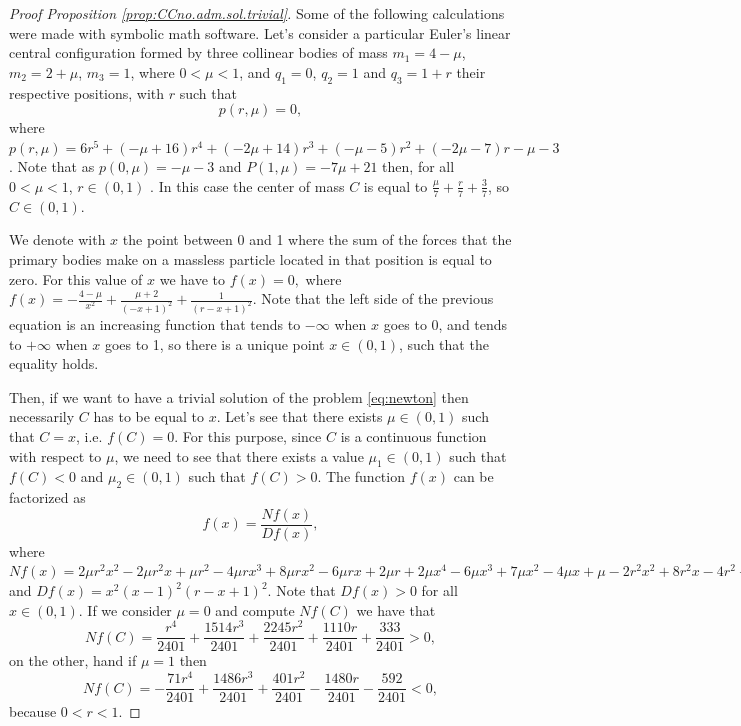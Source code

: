 \documentclass[twoside]{article}
\theoremstyle{remark}
\begin{document}
\begin{proof}[Proof Proposition \ref{prop:CCno.adm.sol.trivial}]
Some of the following calculations were made with symbolic math software. Let's  consider a particular Euler's linear central configuration formed by three collinear bodies of mass $m_1 = 4-\mu$, $m_2 = 2 + \mu$, $m_3 = 1$, where $0<\mu<1$, and $q_1 = 0$, $q_2 = 1$ and $q_3 = 1 + r$ their respective positions, with $r$ such that
\[ p(r,\mu)=0,\]
where $p(r,\mu)=6 r^{5} +\left(- \mu + 16\right) r^{4}  +  \left(- 2 \mu + 14\right) r^{3}+ \left(- \mu - 5\right)  r^{2}+\left(- 2 \mu - 7\right) r - \mu - 3$. Note that as $p(0,\mu)=-\mu-3$ and $P(1,\mu)=-7\mu+21$ then, for all $0<\mu<1$, $r\in (0,1)$ .
In this case the center of mass $C$ is equal to $\frac{\mu}{7} + \frac{r}{7} + \frac{3}{7}$, so $C\in (0,1)$. 

We denote with $x$ the point between 0 and 1 where the sum of the forces that the primary bodies make on a massless particle located in that position is equal to zero. For this value of $x$ we have to
$f(x)=0,$ where $f(x)= - \frac{4-\mu }{x^{2}}+\frac{\mu + 2}{\left(- x + 1\right)^{2}} + \frac{1}{\left(r - x + 1\right)^{2}}$.
Note that the left side of the previous equation is an increasing function that tends to $-\infty$ when $x$ goes to 0, and tends to $+\infty$ when $x$ goes to 1, so there is a unique point $x\in (0,1)$, such that the equality holds.

Then, if we want to have a trivial solution of the problem \eqref{eq:newton} then necessarily $C$ has to be equal to $x$. Let's see that there exists $ \mu \in (0,1) $ such that $ C = x $, i.e. $f(C)=0$. For this purpose, since $C$ is a continuous function with respect to $\mu$,  we need to see that there exists a value $\mu_1\in (0,1)$ such that $f (C) <0$  and   $ \mu_2\in (0,1) $ such that $ f (C)> 0 $.  The function $f(x)$ can be factorized as $$f(x)=\frac{Nf(x)}{Df(x)},$$ where $Nf(x)=2 \mu r^{2} x^{2} - 2 \mu r^{2} x + \mu r^{2} - 4 \mu r x^{3} + 8 \mu r x^{2} - 6 \mu r x + 2 \mu r + 2 \mu x^{4} - 6 \mu x^{3} + 7 \mu x^{2} - 4 \mu x + \mu - 2 r^{2} x^{2} + 8 r^{2} x - 4 r^{2} + 4 r x^{3} - 20 r x^{2} + 24 r x - 8 r - x^{4} + 10 x^{3} - 21 x^{2} + 16 x - 4$ and $Df(x)=x^{2} \left(x - 1\right)^{2} \left(r - x + 1\right)^{2}$. Note that  $Df(x)>0$ for all $x\in (0,1)$. If we consider $\mu=0$ and compute $Nf(C)$ we have that
\[Nf(C)=\frac{r^{4}}{2401} + \frac{1514 r^{3}}{2401} + \frac{2245 r^{2}}{2401} + \frac{1110 r}{2401} + \frac{333}{2401}>0,\]
on the other, hand if  $\mu=1$ then
\[Nf(C)=- \frac{71 r^{4}}{2401} + \frac{1486 r^{3}}{2401} + \frac{401 r^{2}}{2401} - \frac{1480 r}{2401} - \frac{592}{2401}<0,\]
because $0<r<1$. 
\end{proof}
\end{document}
